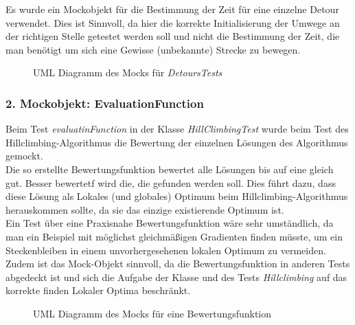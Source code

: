  Es wurde ein Mockobjekt für die Bestimmung der Zeit für eine einzelne Detour verwendet.
 Dies ist Sinnvoll, da hier die korrekte Initialisierung der Umwege an der richtigen Stelle getestet werden soll und nicht die Bestimmung der Zeit, die man benötigt um sich eine Gewisse (unbekannte) Strecke zu bewegen.
 
 \begin{figure}[H]
  \centering
  
  \caption{UML Diagramm des Mocks für \textit{DetoursTests}}
\end{figure}

 
 \subsubsection{2. Mockobjekt: EvaluationFunction}
 
 Beim Test \textit{evaluatinFunction} in der Klasse \textit{HillClimbingTest} wurde beim Test des Hillclimbing-Algorithmus die Bewertung der einzelnen Lösungen des Algorithmus gemockt. \\
 
Die so erstellte Bewertungsfunktion bewertet alle Lösungen bis auf eine gleich gut. Besser bewertetf wird die, die gefunden werden soll.
Dies führt dazu, dass diese Lösung als Lokales (und globales) Optimum beim Hillclimbing-Algorithmus herauskommen sollte, da sie das einzige existierende Optimum ist. \\

Ein Test über eine Praxisnahe Bewertungsfunktion wäre sehr umständlich, da man ein Beispiel mit möglichst gleichmäßigen Gradienten finden müsste, um ein Steckenbleiben in einem unvorhergesehenen lokalen Optimum zu vermeiden. 
 Zudem ist das Mock-Objekt sinnvoll, da die Bewertungsfunktion in anderen Tests abgedeckt ist und sich die Aufgabe der Klasse und des Tests \textit{Hillclimbing} auf das korrekte finden Lokaler Optima beschränkt.
 
  \begin{figure}[H]
  \centering
  
  \caption{UML Diagramm des Mocks für eine Bewertungsfunktion}
\end{figure}
